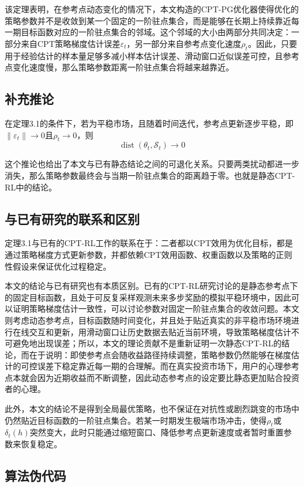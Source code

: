 该定理表明，在参考点动态变化的情况下，本文构造的CPT-PG优化器使得优化的策略参数并不是收敛到某一个固定的一阶驻点集合，而是能够在长期上持续靠近每一期目标函数对应的一阶驻点集合的邻域。这个邻域的大小由两部分共同决定：一部分来自CPT策略梯度估计误差$\varepsilon_t$，另一部分来自参考点变化速度$\rho_t$。因此，只要用于经验估计的样本量足够多减小样本估计误差、滑动窗口近似误差可控，且参考点变化速度慢，那么策略参数距离一阶驻点集合将越来越靠近。

\subsection{补充推论}
在定理3.1的条件下，若为平稳市场，且随着时间迭代，参考点更新逐步平稳，即
$\|\varepsilon_t\| \to 0$且$\rho_t \to 0$，则
\begin{equation}
\operatorname{dist}(\theta_t,\mathcal S_t)\to 0
\end{equation}

这个推论也给出了本文与已有静态结论之间的可退化关系。只要两类扰动都进一步消失，那么策略参数最终会与当期一阶驻点集合的距离趋于零。也就是静态CPT-RL中的结论。
\subsection{与已有研究的联系和区别}

定理3.1与已有的CPT-RL工作的联系在于：二者都以CPT效用为优化目标，都是通过策略梯度方式更新参数，并都依赖CPT效用函数、权重函数以及策略的正则性假设来保证优化过程稳定。

本文的结论与已有研究也有本质区别。已有的CPT-RL研究讨论的是静态参考点下的固定目标函数，且处于可反复采样观测未来多步奖励的模拟平稳环境中，因此可以证明策略梯度估计一致性，可以讨论参数对固定一阶驻点集合的收敛问题。本文则考虑动态参考点，目标函数随时间变化，并且处于贴近真实的非平稳市场环境进行在线交互和更新，用滑动窗口让历史数据去贴近当前环境，导致策略梯度估计不可避免地出现误差；所以，本文的理论贡献不是重新证明一次静态CPT-RL的结论，而在于说明：即使参考点会随收益路径持续调整，策略参数仍然能够在梯度估计的可控误差下稳定靠近每一期的合理解。而在真实投资市场下，用户的心理参考点本就会因为近期收益而不断调整，因此动态参考点的设定要比静态更加贴合投资者的心理。

此外，本文的结论不是得到全局最优策略，也不保证在对抗性或剧烈跳变的市场中仍然贴近目标函数的一阶驻点集合。若某一时期发生极端市场冲击，使得$\rho_t$或$\delta_t(h)$突然变大，此时只能通过缩短窗口、降低参考点更新速度或者暂时重置参数来恢复稳定。


\subsection{算法伪代码}

